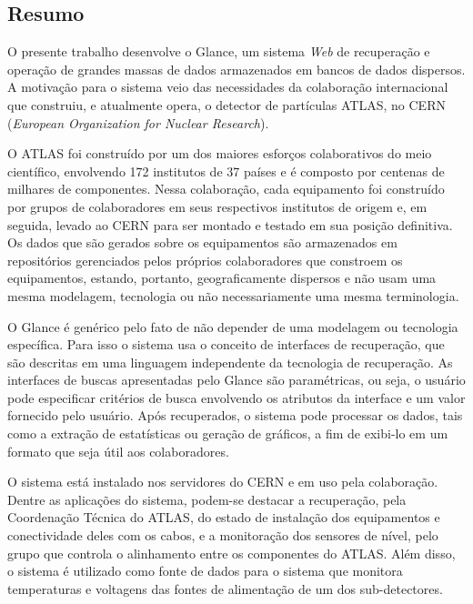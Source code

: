 \vfill
\begin{center}
\section*{Resumo\label{Resumo}}
\end{center}
O presente trabalho desenvolve o Glance, um sistema \emph{Web} de
recuperação e operação de grandes massas de dados armazenados em bancos de
dados dispersos.
%
A motivação para o sistema veio das necessidades da colaboração internacional
que construiu, e atualmente opera, o detector de partículas ATLAS, no CERN
(\textit{European Organization for Nuclear Research}).

O ATLAS foi construído por um dos maiores esforços colaborativos do meio
científico, envolvendo 172 institutos de 37 países e é composto por centenas de
milhares de componentes.
%
Nessa colaboração, cada equipamento foi construído por grupos de colaboradores
em seus respectivos institutos de origem e, em seguida, levado ao CERN para ser
montado e testado em sua posição definitiva.
%
Os dados que são gerados sobre os equipamentos são armazenados em repositórios
gerenciados pelos próprios colaboradores que constroem os equipamentos,
estando, portanto, geograficamente dispersos e não usam uma mesma modelagem,
tecnologia ou não necessariamente uma mesma terminologia.

O Glance é genérico pelo fato de não depender de uma modelagem ou
tecnologia específica.
%
Para isso o sistema usa o conceito de interfaces de recuperação, que são
descritas em uma linguagem independente da tecnologia de recuperação.
%
As interfaces de buscas apresentadas pelo Glance são paramétricas, ou seja, o
usuário pode especificar critérios de busca envolvendo os atributos da
interface e um valor fornecido pelo usuário.
%
Após recuperados, o sistema pode processar os dados, tais como a extração de
estatísticas ou geração de gráficos, a fim de exibi-lo em um formato que seja
útil aos colaboradores.

O sistema está instalado nos servidores do CERN e em uso pela colaboração.
%
Dentre as aplicações do sistema, podem-se destacar a recuperação, pela
Coordenação Técnica do ATLAS, do estado de instalação dos equipamentos e
conectividade deles com os cabos, e a monitoração dos sensores de nível, pelo
grupo que controla o alinhamento entre os componentes do ATLAS.
%
Além disso, o sistema é utilizado como fonte de dados para o sistema que
monitora temperaturas e voltagens das fontes de alimentação de um dos
sub-detectores.


